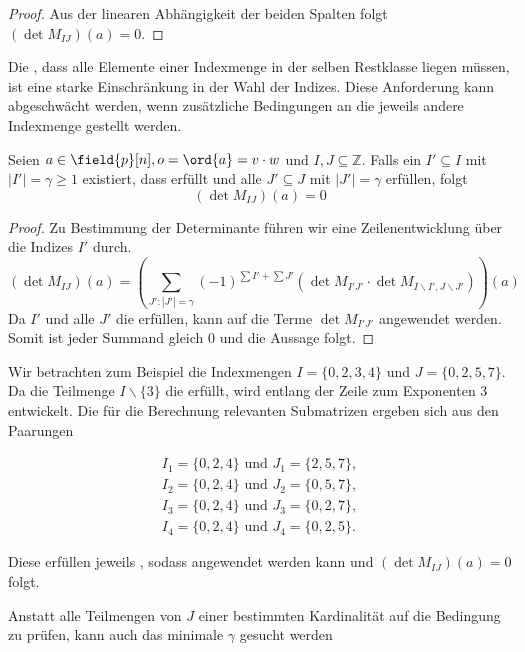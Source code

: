 {\begin{proof}
    Aus der linearen Abhängigkeit der beiden Spalten folgt $(\det M_{IJ})(a) = 0$.
\end{proof}

Die , dass alle Elemente einer Indexmenge in der selben Restklasse liegen müssen, ist eine starke Einschränkung in der Wahl der Indizes. Diese Anforderung kann abgeschwächt werden, wenn zusätzliche Bedingungen an die jeweils andere Indexmenge gestellt werden. 



\begin{satz} \label{satz:equal-columns-subs}
    Seien $a \in \field{p}[n], o = \ord{a} = v\cdot w$ und $I,J \subseteq \mathbb{Z}$.
    Falls ein $I' \subseteq I$ mit $|I'| = \gamma \geq 1$ existiert, dass  erfüllt und alle $J' \subseteq J$ mit $|J'| = \gamma$  erfüllen, folgt
    \begin{equation*}
        (\det M_{IJ})(a) = 0
    \end{equation*}
\end{satz}

\begin{proof}
    Zu Bestimmung der Determinante führen wir eine Zeilenentwicklung über die Indizes $I'$ durch. 
\begin{equation*}
    (\det M_{IJ})(a) = \left( \sum_{J':|J'| = \gamma} (-1)^{\sum I' + \sum J'} \left( \det M_{I'J'} \cdot \det M_{I\backslash I',J\backslash J'} \right) \right)(a)
\end{equation*}
Da $I'$ und alle $J'$ die  erfüllen, kann  auf die Terme $\det M_{I'J'}$ angewendet werden. Somit ist jeder Summand gleich $0$ und die Aussage folgt.
\end{proof}


Wir betrachten zum Beispiel die Indexmengen $I = \{0,2,3,4\}$ und $J = \{0,2,5,7\}$. Da die Teilmenge $I\backslash\{3\}$ die  erfüllt, wird entlang der Zeile zum Exponenten $3$ entwickelt. Die für die Berechnung relevanten Submatrizen ergeben sich aus den Paarungen

\begin{align*}
    I_1=\{0,2,4\} \text{ und } J_1=\{2,5,7\}, \\
    I_2=\{0,2,4\} \text{ und } J_2=\{0,5,7\}, \\
    I_3=\{0,2,4\} \text{ und } J_3=\{0,2,7\}, \\
    I_4=\{0,2,4\} \text{ und } J_4=\{0,2,5\}.
\end{align*}

Diese erfüllen jeweils , sodass  angewendet werden kann und $(\det M_{IJ})(a) = 0$ folgt.
}

Anstatt alle Teilmengen von $J$ einer bestimmten Kardinalität auf die Bedingung zu prüfen, kann auch das minimale $\gamma$ gesucht werden